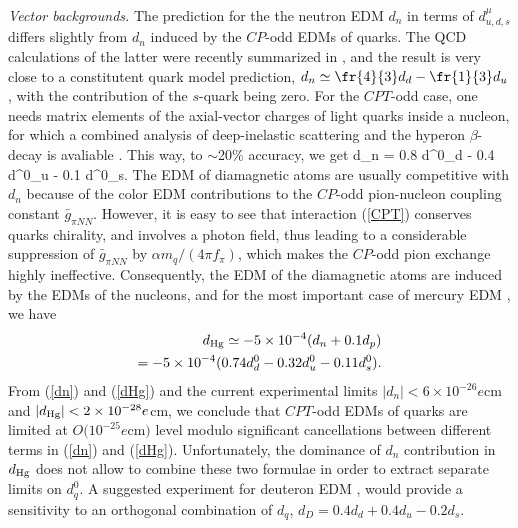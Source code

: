 \documentclass[prl,twocolumn,tightenlines,preprintnumbers,floatfix,nofootinbib]{revtex4}
\def\ba{\begin{eqnarray}}
\def\ea{\end{eqnarray}}
\begin{document}
{\em Vector backgrounds. }The prediction for the the neutron EDM $d_n$ in terms of 
$d_{u,d,s}^\mu$ differs
slightly from $d_n$ induced by the $CP$-odd EDMs of quarks. The QCD calculations of the 
latter were recently summarized in \cite{PRann}, and the result is very close 
to a constitutent quark model prediction, $d_n \simeq \fr{4}{3} d_d- \fr{1}{3} d_u$,
with the contribution of the $s$-quark being zero. For the $CPT$-odd case, one needs 
matrix elements of the axial-vector charges of light quarks inside a nucleon, for which a
combined analysis of deep-inelastic scattering and the hyperon $\beta$-decay 
is avaliable \cite{EK}. This way, to $\sim$20\% accuracy, we get
\be
d_n = 0.8 d^0_d - 0.4 d^0_u - 0.1 d^0_s.
\label{dn}
\ee
The EDM of diamagnetic atoms are usually competitive with $d_n$ because of the 
color EDM contributions to the $CP$-odd pion-nucleon coupling constant $\bar g_{\pi NN}$. 
However, it is easy to see that interaction (\ref{CPT}) conserves quarks chirality, and 
involves a photon field, thus leading to a considerable suppression of 
$\bar g_{\pi NN}$ by $\alpha m_q/(4\pi f_\pi)$, which makes the $CP$-odd pion exchange
highly ineffective. Consequently, the EDM of the diamagnetic atoms are induced by
the EDMs of the nucleons, and for the most important case of mercury EDM \cite{DS}, we have
\ba
d_{\rm Hg} \simeq - 5\times 10^{-4}(d_n + 0.1 d_p)\nonumber\\=
-5\times 10^{-4}(0.74 d_d^0 -0.32 d_u^0 - 0.11 d_s^0).
\label{dHg}
\ea
From (\ref{dn}) and (\ref{dHg}) and the current experimental limits
$|d_n| < 6\times 10^{-26} e$cm and $|d_{\rm Hg}|< 2\times 10^{-28}e$cm,
we conclude that $CPT$-odd EDMs of quarks are limited 
at $O(10^{-25}e$cm$)$ level modulo significant cancellations between different terms 
in (\ref{dn}) and (\ref{dHg}). Unfortunately, the dominance of $d_n$ contribution in 
$d_{\rm Hg}$ does not allow to combine these two formulae in order to extract separate 
limits on $d^0_q$. A suggested experiment for deuteron EDM \cite{Deut}, 
would provide a sensitivity to an 
orthogonal combination of $d_q$,
$d_D = 0.4 d_d + 0.4 d_u - 0.2 d_s$. 
\end{document}
